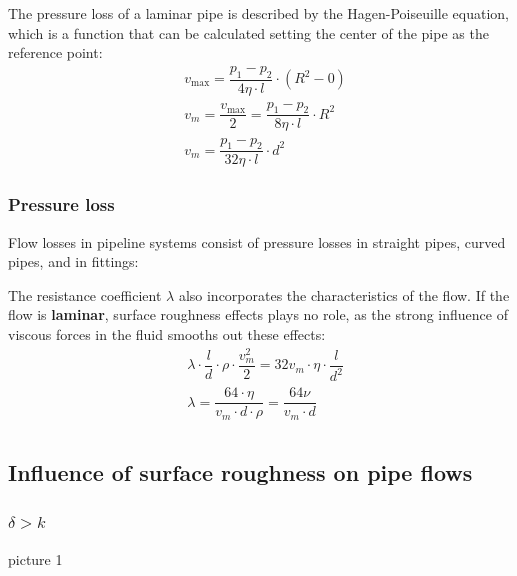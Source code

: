 \documentclass{article}
\begin{document}
The pressure loss of a laminar pipe is described by the Hagen-Poiseuille equation, which
is a function that can be calculated setting the center of the pipe as the reference point:
\begin{equation*}
\begin{aligned}
        &v_{\text{max}} = \dfrac{p_1 - p_2}{4\eta\cdot l} \cdot (R^2 - 0) \\
        &v_m = \dfrac{v_{\text{max}}}{2} = \dfrac{p_1 - p_2}{8\eta\cdot l} \cdot R^2\\
        &v_m = \dfrac{p_1 - p_2}{32\eta\cdot l} \cdot d^2
\end{aligned}
\end{equation*}

\subsubsection{Pressure loss}
Flow losses in pipeline systems consist of pressure losses in straight pipes, curved pipes,
and in fittings:

The resistance coefficient $\lambda$ also incorporates the characteristics of the flow.
If the flow is \textbf{laminar}, surface roughness effects plays no role, as the strong
influence of viscous forces in the fluid smooths out these effects:
\begin{equation*}
    \begin{aligned}
        &\lambda \cdot \dfrac{l}{d} \cdot \rho \cdot \dfrac{v_m^2}{2} = 32v_m \cdot \eta \cdot \dfrac{l}{d^2}\\
        &\lambda = \dfrac{64\cdot \eta}{v_m \cdot d \cdot \rho} = \dfrac{64\nu}{v_m\cdot d}\\
    \end{aligned}
\end{equation*}
\vspace*{-0.15cm}

\newpage
\subsection{Influence of surface roughness on pipe flows}
\subsubsection{$\delta > k$}
picture 1
\end{document}
